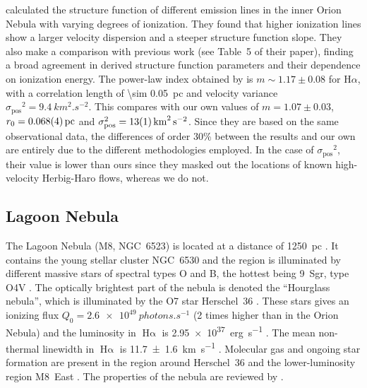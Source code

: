 \documentclass[fleqn,usenatbib, useAMS, a4paper]{mnras}
\newcommand\startNEW{\color{black}}
\newcommand\stopNEW{\color{black}}
\newcommand\pos{\ensuremath{_{\mathrm{pos}}}}
\newcommand\halpha{H${\alpha}$}
\newcommand\ha{\ensuremath{\text{H}\upalpha}}
\begin{document}
\citet{arthur2016turbulence}
\startNEW
calculated the structure function of different emission lines in the inner Orion Nebula with varying degrees of ionization.
They found that higher ionization lines show a larger velocity dispersion
and a steeper structure function slope.
\stopNEW
They also make a comparison with previous work (see Table~5 of their paper), finding a broad
\startNEW
agreement in derived structure function parameters
and their dependence on ionization energy.
\stopNEW
The power-law index obtained by \citet{arthur2016turbulence} is
\startNEW
\(m \sim 1.17 \pm 0.08\) for \halpha,
with a correlation length of \SI{\sim 0.05}{pc} and velocity variance
\(\sigma\pos^2= \SI{9.4}{km^{2 }.s^{-2}}\).
This compares with our own values of
\(m = 1.07 \pm 0.03\), \(r_0 = \SI{0.068 \pm 0.004}{pc}\)
and \(\sigma\pos^2 = \SI{13 \pm 1}{ km^{2}.s^{-2}}\). 
Since they are based on the same observational data,
the differences of order 30\% between the \citet{arthur2016turbulence}
results and our own are entirely due to the different methodologies employed.
In the case of \(\sigma\pos^2\), their value is lower than ours since
they masked out the locations of known high-velocity Herbig-Haro flows, whereas we do not.
\stopNEW

\startNEW
\subsection{Lagoon Nebula}
\label{sec:lagoon-nebula}
\stopNEW

The Lagoon Nebula (M8, NGC~6523) is located at a distance of \SI{1250}{pc}  \citetext{\SI{1}{\arcsecond} = \SI{0.006}{pc} ; \citealp{2005A&A...430..941P}}.
It contains the young stellar cluster NGC~6530 and the region is illuminated by different massive stars of spectral types O and B, the hottest being 9~Sgr, type O4V \citep{Damiani:2017b}.
\startNEW
The optically brightest part of the nebula is denoted the ``Hourglass nebula'',
which is illuminated by the O7 star Herschel~36 \citep{1986AJ.....91..870W}.
\stopNEW
These stars gives an ionizing flux \(Q_0 = \SI{2.6e49}{photons.s^{-1}}\) (2 times higher than in the Orion Nebula) and the luminosity in \ha{} is \SI{2.95e37}{erg.s^{-1}} \citep{1984ApJ...287..116K}.
The mean non-thermal linewidth in \ha{} is \SI{11.7 \pm 1.6}{km.s^{-1}} \citep{1973ApJ...183..851B}.
\startNEW
Molecular gas and ongoing star formation are present in the region around
Herschel~36 \citep{Arias:2006e, Tiwari:2018a} and the lower-luminosity region
M8~East \citep{1984ApJ...278..170S, Tiwari:2020a}.
\stopNEW
The properties of the nebula are reviewed by \citet{2008hsf2.book..533T}.
\end{document}
